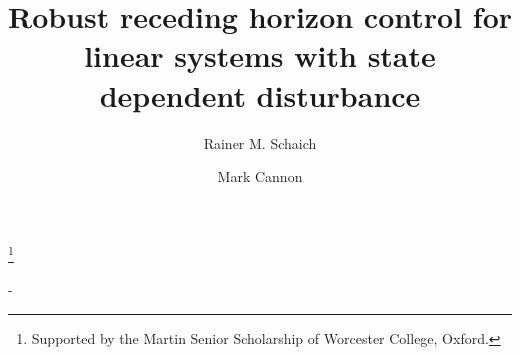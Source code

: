 \documentclass{ifacconf}
\begin{document}
\begin{frontmatter}


\title{Robust receding horizon control for linear systems with state dependent disturbance} 


\thanks[footnoteinfo]{Supported by the Martin Senior Scholarship of Worcester College, Oxford.}

\author[Oxford]{Rainer M. Schaich} 
\author[Oxford]{Mark Cannon} 

\address[Oxford]{Department of Engineering Science, University of Oxford, OX1 3PJ, UK. (e-mail: 
rainer.schaich@eng.ox.ac.uk, mark.cannon@eng.ox.ac.uk).}

\begin{abstract}                %

\end{abstract}

\begin{keyword}
-
\end{keyword}

\end{frontmatter}
\end{document}
